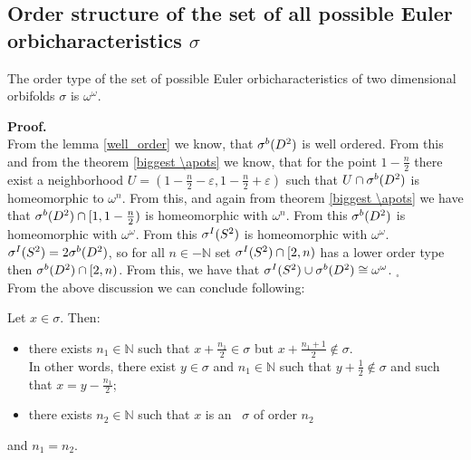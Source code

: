 \subsection{Order structure of the set of all possible Euler orbicharacteristics $\sigma$}
\begin{theorem}
The order type of the set of possible Euler orbicharacteristics of two dimensional orbifolds 
$\sigma$ is $\omega^\omega$. 
\end{theorem}
\noindent\textbf{Proof.} \\
From the lemma \ref{well_order} we know, that ${\mathcal{\sigma}^b(D^2)}$ is well ordered. From this and 
from the theorem \ref{biggest \apots} we know, that for the point $1-\frac{n}{2}$ there exist 
a neighborhood $U=(1-\frac{n}{2}-\varepsilon,1-\frac{n}{2}+\varepsilon)$ such that $U \cap 
{\mathcal{\sigma}^b(D^2)}$ is homeomorphic to $\omega^n$. From this, and again from theorem \ref{biggest \apots} 
we have that ${\mathcal{\sigma}^b(D^2)} \cap [1,1-\frac{n}{2})$ is homeomorphic with $\omega^n$. 
From this ${\mathcal{\sigma}^b(D^2)}$ is homeomorphic with $\omega^\omega$. From this ${\mathcal{\sigma}^I(S^2)}$ is homeomorphic 
with $\omega^\omega$. \\
${\mathcal{\sigma}^I(S^2)} = 2{\mathcal{\sigma}^b(D^2)}$, so for all $n\in -\mathbb{N}$ set ${\mathcal{\sigma}^I(S^2)} \cap [2,n)$ has a lower order type then 
${\mathcal{\sigma}^b(D^2)}\cap [2,n)$. From this, we have that ${\mathcal{\sigma}^I(S^2)} \cup {\mathcal{\sigma}^b(D^2)} \cong \omega^\omega$. $_\square$ \\[4pt]
From the above discussion we can conclude following:

\begin{corollary}\label{predescors}
Let $x \in \sigma$. Then:
\begin{itemize}
\item there exists $n_1 \in \mathbb{N}$ such that $x + \frac{n_1}{2} \in \sigma$ 
but $x+\frac{n_1+1}{2} \not\in \sigma$. \\ In other words, there exist $y \in \sigma$ and 
$n_1 \in \mathbb{N}$ such that 
$y + \frac{1}{2} \not\in \sigma$ and such that $x = y - \frac{n_1}{2}$;
\item there exists $n_2 \in \mathbb{N}$ such that $x$ is an \apots\ $\sigma$ of 
order $n_2$
\end{itemize}
and $n_1 = n_2$.
\end{corollary}




